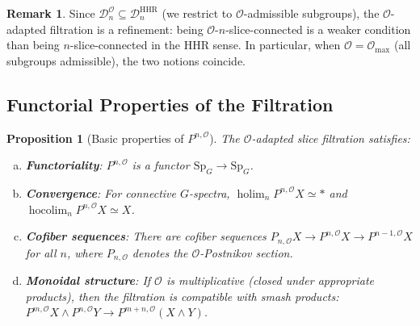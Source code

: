 \documentclass[12pt]{article}
\newtheorem{proposition}[theorem]{Proposition}
\theoremstyle{definition}
\newtheorem{remark}[theorem]{Remark}
\newcommand{\cO}{\mathcal{O}}
\newcommand{\Sp}{\mathrm{Sp}}
\DeclareMathOperator{\holim}{holim}
\DeclareMathOperator{\hocolim}{hocolim}
\begin{document}
\begin{remark}
Since $\mathcal{D}_n^{\cO} \subseteq \mathcal{D}_n^{\mathrm{HHR}}$ (we restrict to $\cO$-admissible
subgroups), the $\cO$-adapted filtration is a refinement: being $\cO$-$n$-slice-connected is a
weaker condition than being $n$-slice-connected in the HHR sense. In particular, when
$\cO = \cO_{\max}$ (all subgroups admissible), the two notions coincide.
\end{remark}

\subsection{Functorial Properties of the Filtration}

\begin{proposition}[Basic properties of $P^{n,\cO}$]
\label{prop:filtration-props}
The $\cO$-adapted slice filtration satisfies:
\begin{enumerate}[(a)]
  \item \textbf{Functoriality}: $P^{n,\cO}$ is a functor $\Sp_G \to \Sp_G$.
  \item \textbf{Convergence}: For connective $G$-spectra, $\holim_n P^{n,\cO} X \simeq *$ and
    $\hocolim_n P^{n,\cO} X \simeq X$.
  \item \textbf{Cofiber sequences}: There are cofiber sequences
    $P_{n,\cO} X \to P^{n,\cO} X \to P^{n-1,\cO} X$
    for all $n$, where $P_{n,\cO}$ denotes the $\cO$-Postnikov section.
  \item \textbf{Monoidal structure}: If $\cO$ is multiplicative (closed under appropriate products),
    then the filtration is compatible with smash products: $P^{m,\cO} X \wedge P^{n,\cO} Y \to
    P^{m+n,\cO}(X \wedge Y)$.
\end{enumerate}
\end{proposition}
\end{document}
